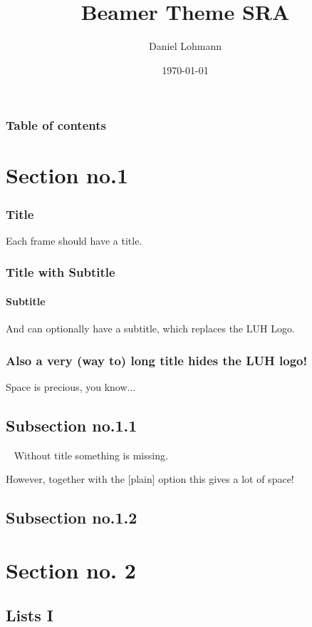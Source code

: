 \documentclass[aspectratio=169]{beamer}
\begin{document}
\title{Beamer Theme SRA}
\author[dl]{Daniel Lohmann}
\date{\today}

\begin{frame}[title]
	\titlepage
\end{frame}

\begin{frame}\frametitle{Table of contents}\tableofcontents
\end{frame}


\section{Section no.1}

\begin{frame}
	\frametitle{Title}
	Each frame should have a title.
\end{frame}

\begin{frame}
	\frametitle{Title with Subtitle}
	\framesubtitle{Subtitle}
	And can optionally have a subtitle, which replaces the LUH Logo.
\end{frame}

\begin{frame}
	\frametitle{Also a very (way to) long title hides the LUH logo!}
	Space is precious, you know...
\end{frame}

\subsection{Subsection no.1.1  }

\begin{frame}{~}
	Without title something is missing.
\end{frame}

\begin{frame}[plain]{}
	However, together with the [plain] option this gives a lot of space!
\end{frame}

\subsection{Subsection no.1.2}

\section{Section no. 2}

\subsection{Lists I}
\end{document}
